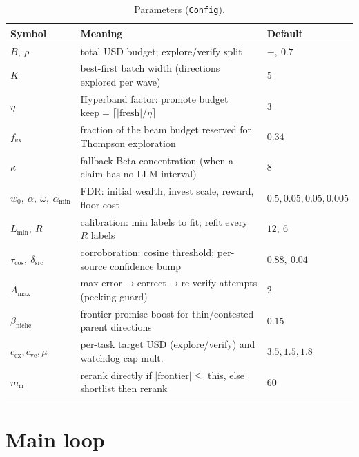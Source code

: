 \documentclass[11pt]{article}
\begin{document}
\begin{table}[h]\centering\small
\begin{tabular}{@{}lll@{}}
\toprule
Symbol & Meaning & Default \\ \midrule
$B,\ \rho$ & total USD budget; explore/verify split & $-,\ 0.7$\\
$K$ & best-first batch width (directions explored per wave) & $5$\\
$\eta$ & Hyperband factor: promote budget $\mathrm{keep}=\lceil |\text{fresh}|/\eta\rceil$ & $3$\\
$f_{\mathrm{ex}}$ & fraction of the beam budget reserved for Thompson exploration & $0.34$\\
$\kappa$ & fallback Beta concentration (when a claim has no LLM interval) & $8$\\
$w_0,\ \alpha,\ \omega,\ \alpha_{\min}$ & FDR: initial wealth, invest scale, reward, floor cost & $0.5,0.05,0.05,0.005$\\
$L_{\min},\ R$ & calibration: min labels to fit; refit every $R$ labels & $12,\ 6$\\
$\tau_{\cos},\ \delta_{\mathrm{src}}$ & corroboration: cosine threshold; per-source confidence bump & $0.88,\ 0.04$\\
$A_{\max}$ & max error$\to$correct$\to$re-verify attempts (peeking guard) & $2$\\
$\beta_{\mathrm{niche}}$ & frontier promise boost for thin/contested parent directions & $0.15$\\
$c_{\mathrm{ex}},c_{\mathrm{ve}},\mu$ & per-task target USD (explore/verify) and watchdog cap mult. & $3.5,1.5,1.8$\\
$m_{\mathrm{rr}}$ & rerank directly if $|\text{frontier}|\le$ this, else shortlist then rerank & $60$\\
\bottomrule
\end{tabular}
\caption{Parameters (\texttt{Config}).}
\end{table}

\section{Main loop}
\end{document}
